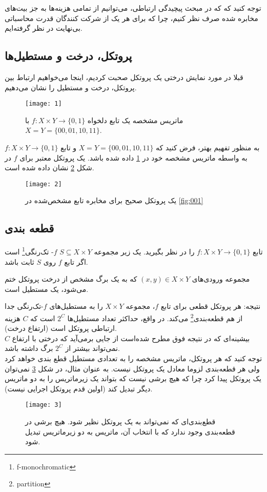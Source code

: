 توجه کنید که که در مبحث پیچیدگی ارتباطی، می‌توانیم از تمامی هزینه‌ها به جز بیت‌های مخابره شده صرف نظر کنیم، چرا که برای هر یک از شرکت کنندگان قدرت محاسباتی بی‌نهایت در نظر گرفته‌ایم.

\subsection{پروتکل، درخت و مستطیل‌ها ‌}
قبلا در مورد نمایش درختی یک پروتکل صحبت کردیم، اینجا می‌خواهیم ارتباط بین پروتکل، درخت و مستطیل را نشان می‌دهیم.
\begin{figure}[h]
    \texttt{[image: 1]}
    \centering
    \label{fig:001}
    \caption{ماتریس مشخصه یک تابع دلخواه $f: X \times Y \rightarrow \{0, 1\}$ با $X = Y = \{00, 01, 10, 11\}$.}
\end{figure}
به منظور تفهیم‌ بهتر، فرض کنید که $X = Y = \{00, 01, 10, 11\}$ و تابع $f : X \times Y \rightarrow \{0,1\}$ به واسطه ماتریس مشخصه خود در \ref{fig:001} داده شده باشد. یک پروتکل معتبر برای $f$ در شکل \ref{fig:002} نشان داده شده است.
\begin{figure}[h]
    \texttt{[image: 2]}
    \centering
    \label{fig:002}
    \caption{یک پروتکل صحیح برای مخابره تابع مشخص‌شده در \autoref{fig:001}}
\end{figure}

\subsection{قطعه بندی}
\par
\begin{definition}
تابع  $f : X \times Y \rightarrow \{0,1\} $ را در نظر بگیرید. یک زیر مجموعه $ S \subseteq X \times Y$ $f$- تک‌رنگی\footnote{f-monochromatic} است اگر تابع $f$ روی $S$ ثابت باشد.
\end{definition}

\begin{theorem}
مجموعه ورودی‌های $(x,y) \in X \times Y$ که به یک برگ مشخص از درخت پروتکل ختم می‌شود، یک مستطیل است.
\end{theorem}

نتیجه: هر پروتکل قطعی برای تابع $f$، مجموعه  $X \times Y $ را به مستطیل‌های $f$-تک‌رنگی جدا از هم قطعه‌بندی\footnote{partition} می‌کند. در واقع، حداکثر تعداد مستطیل‌ها $2^{C}$ است که $C$ هزینه ارتباطی پروتکل است (ارتفاع درخت).
\\
بیشینه‌ای که در نتیجه فوق مطرح شده‌است از جایی بر‌می‌آید که درختی با ارتفاع $C$ نمی‌تواند بیشتر از $2^{C}$ برگ داشته باشد.\\
توجه کنید که هر پروتکل، ماتریس مشخصه را به تعدادی مستطیل قطع بندی خواهد کرد ولی هر قطعه‌بندی لزوما معادل یک پروتکل نیست. به عنوان مثال، در شکل \ref{fig:003} نمی‌توان یک پروتکل پیدا کرد چرا که هیچ برشی نیست که بتواند یک زیرماتریس را به دو ماتریس‌ دیگر تبدیل کند  (اولین قدم پروتکل اجرایی نیست).
\begin{figure}[h]
    \texttt{[image: 3]}
    \centering
    \label{fig:003}
    \caption{قطع‌بندی‌ای که نمی‌تواند به یک پروتکل نظیر شود. هیچ برشی در قطعه‌بندی وجود ندارد که با انتخاب آن، ماتریس به دو زیرماتریس تبدیل شود.}
\end{figure}

